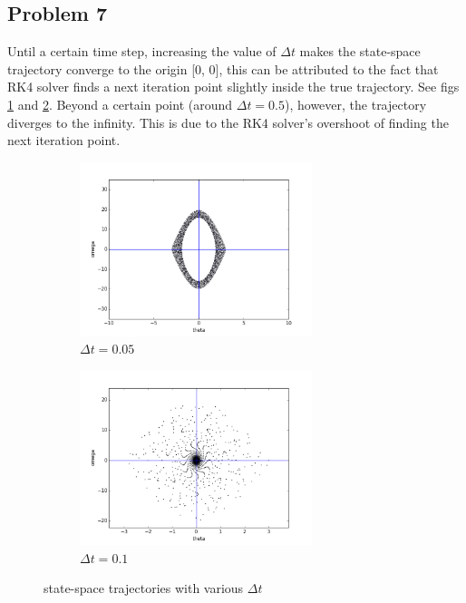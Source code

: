 \documentclass{article}
\begin{document}
\subsection*{Problem 7}
Until a certain time step, increasing the value of $\Delta t$ makes the state-space trajectory converge to the origin [0, 0], this can be attributed to the fact that RK4 solver finds a next iteration point slightly inside the true trajectory. See figs \ref{q71} and \ref{q72}. Beyond a certain point (around $\Delta t = 0.5$), however, the trajectory diverges to the infinity. This is due to the RK4 solver's overshoot of finding the next iteration point.
\begin{figure}
\centering
\begin{subfigure}{.5\textwidth}
  \centering
  \includegraphics[height=2in]{figs/Q7/t005.png}
  \caption{$\Delta t = 0.05$}
  \label{q71}
\end{subfigure}%
\begin{subfigure}{.5\textwidth}
  \centering
  \includegraphics[height=2in]{figs/Q7/t01.png}
  \caption{$\Delta t = 0.1$}
  \label{q72}
\end{subfigure}
\caption{state-space trajectories with various $\Delta t$}
\label{fig:varying_t}
\end{figure}
\end{document}
